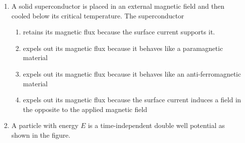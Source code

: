 \documentclass[journal]{IEEEtran}
\begin{document}
\begin{enumerate}
    \begin{enumerate}
    \end{enumerate}
    \item A solid superconductor is placed in an external magnetic field and then cooled below its critical temperature. The superconductor 
    \begin{enumerate}
        \item retains its magnetic flux because the surface current supports it.
        \item expels out its magnetic flux because it behaves like a paramagnetic material 
        \item expels out its magnetic flux because it behaves like an anti-ferromagnetic material 
        \item expels out its magnetic flux because the surface current induces a field in the opposite to the applied magnetic field 
    \end{enumerate}
    \item A particle with energy $E$ is a time-independent double well potential as shown in the figure. 
     
    

\end{enumerate}
\end{document}
